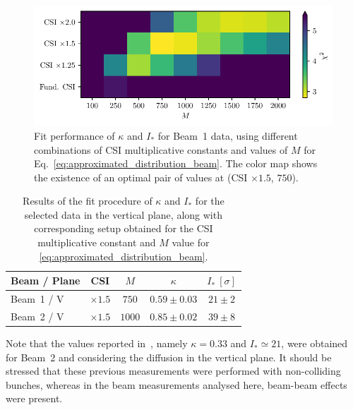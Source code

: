 \begin{figure}[thp]
    \centering
    \includegraphics[trim={0 2.5mm 0 1.5mm}, clip, width=0.98\columnwidth]{5_Diffusion_measurement_LHC/figs/fourth.pdf}
    \caption{Fit performance of $\kappa$ and $I_\ast$ for Beam~1 data, using different combinations of CSI multiplicative constants and values of $M$ for Eq.~\eqref{eq:approximated_distribution_beam}. The color map shows the existence of an optimal pair of values at (CSI $\times 1.5$, $750$).}
    \label{fig:fourth}
\end{figure}
%
\begin{table}[thp]
    \centering
    \begin{tabular}{lcccc}
        \toprule
        Beam / Plane & CSI & $M$ & $\kappa$ & $I_\ast\ [\sigma]$ \\
        \midrule
        Beam~1 / V & $\times1.5$ & $750$ & $0.59\pm0.03$ & $21\pm2$ \\
        Beam~2 / V & $\times1.5$ & $1000$ & $0.85\pm0.02$ & $39\pm8$ \\
        \bottomrule
    \end{tabular}
    \caption{Results of the fit procedure of $\kappa$ and $I_\ast$ for the selected data in the vertical plane, along with corresponding setup obtained for the CSI multiplicative constant and $M$ value for \eqref{eq:approximated_distribution_beam}.}
    \label{tab:fit_results}
\end{table}
%

Note that the values reported in~\cite{bazzani2020diffusion}, namely $\kappa=0.33 $ and $I_\ast \simeq 21$, were obtained for Beam~2 and considering the diffusion in the vertical plane. It should be stressed that these previous measurements were performed with non-colliding bunches, whereas in the beam measurements analysed here, beam-beam effects were present.


